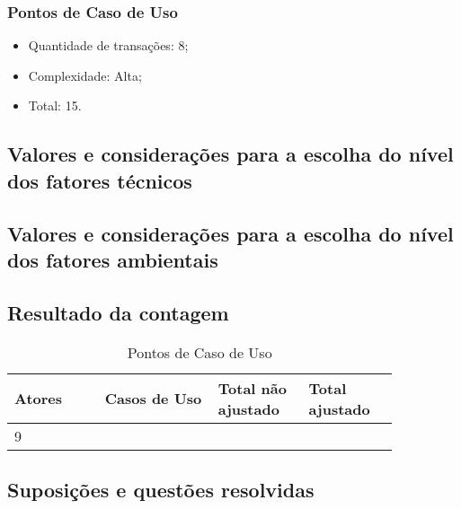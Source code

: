 \pagebreak
\subsubsection{Pontos de Caso de Uso}

\begin{itemize}
 \item Quantidade de transações: 8;
 \item Complexidade: Alta;
 \item Total: 15.
\end{itemize}

\vfill

\subsection{Valores e considerações para a escolha do nível dos fatores técnicos}

\subsection{Valores e considerações para a escolha do nível dos fatores ambientais}

\pagebreak
\subsection{Resultado da contagem}

\begin{table*}[!h]
\centering
\caption{Pontos de Caso de Uso}
\label{Rotulo}
  \begin{tabular}{|p{0.20\linewidth}|p{0.25\linewidth}|p{0.20\linewidth}|p{0.20\linewidth}|}
  \hline
  \textbf{Atores} & \textbf{Casos de Uso} & \textbf{Total não ajustado} & \textbf{Total ajustado} \\ 
  \hline

  9 & & &\\
  \hline
  \end{tabular}
\end{table*}


\subsection{Suposições e questões resolvidas}


